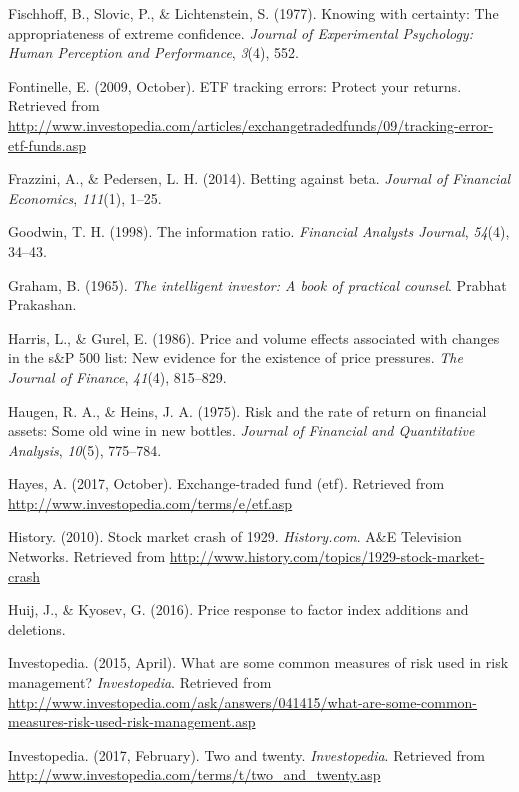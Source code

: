 \documentclass[12pt,twoside]{reedthesis}
\theoremstyle{definition}
\theoremstyle{definition}
\theoremstyle{definition}
\theoremstyle{remark}
\begin{document}
\hypertarget{ref-fischhoff1977}{}
Fischhoff, B., Slovic, P., \& Lichtenstein, S. (1977). Knowing with
certainty: The appropriateness of extreme confidence. \emph{Journal of
Experimental Psychology: Human Perception and Performance}, \emph{3}(4),
552.

\hypertarget{ref-fontinelle2009}{}
Fontinelle, E. (2009, October). ETF tracking errors: Protect your
returns. Retrieved from
\url{http://www.investopedia.com/articles/exchangetradedfunds/09/tracking-error-etf-funds.asp}

\hypertarget{ref-frazzini2014}{}
Frazzini, A., \& Pedersen, L. H. (2014). Betting against beta.
\emph{Journal of Financial Economics}, \emph{111}(1), 1--25.

\hypertarget{ref-goodwin1998}{}
Goodwin, T. H. (1998). The information ratio. \emph{Financial Analysts
Journal}, \emph{54}(4), 34--43.

\hypertarget{ref-graham1965}{}
Graham, B. (1965). \emph{The intelligent investor: A book of practical
counsel}. Prabhat Prakashan.

\hypertarget{ref-harris1986}{}
Harris, L., \& Gurel, E. (1986). Price and volume effects associated
with changes in the s\&P 500 list: New evidence for the existence of
price pressures. \emph{The Journal of Finance}, \emph{41}(4), 815--829.

\hypertarget{ref-haugen1975}{}
Haugen, R. A., \& Heins, J. A. (1975). Risk and the rate of return on
financial assets: Some old wine in new bottles. \emph{Journal of
Financial and Quantitative Analysis}, \emph{10}(5), 775--784.

\hypertarget{ref-hayes2017}{}
Hayes, A. (2017, October). Exchange-traded fund (etf). Retrieved from
\url{http://www.investopedia.com/terms/e/etf.asp}

\hypertarget{ref-history2010}{}
History. (2010). Stock market crash of 1929. \emph{History.com}. A\&E
Television Networks. Retrieved from
\url{http://www.history.com/topics/1929-stock-market-crash}

\hypertarget{ref-huij2016}{}
Huij, J., \& Kyosev, G. (2016). Price response to factor index additions
and deletions.

\hypertarget{ref-investopedia2015}{}
Investopedia. (2015, April). What are some common measures of risk used
in risk management? \emph{Investopedia}. Retrieved from
\url{http://www.investopedia.com/ask/answers/041415/what-are-some-common-measures-risk-used-risk-management.asp}

\hypertarget{ref-investopedia2017}{}
Investopedia. (2017, February). Two and twenty. \emph{Investopedia}.
Retrieved from
\url{http://www.investopedia.com/terms/t/two_and_twenty.asp}
\end{document}
